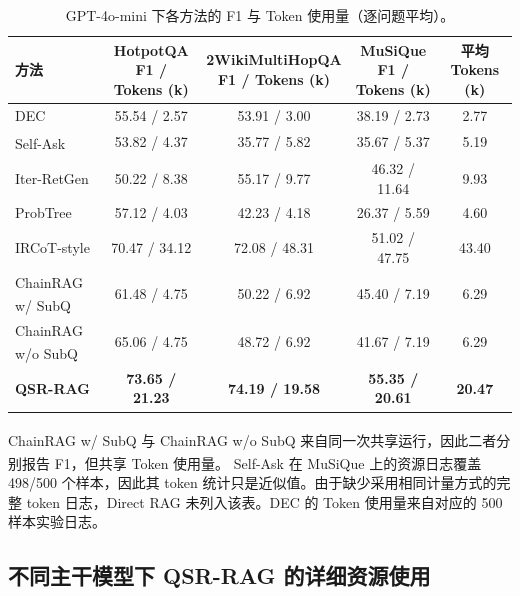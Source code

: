 \documentclass[11pt]{article}
\begin{document}
	\begin{table}[t]
		\centering
		\caption{GPT-4o-mini 下各方法的 F1 与 Token 使用量（逐问题平均）。}
		\label{tab:token-usage}
		\small
		\setlength{\tabcolsep}{5pt}
		\begin{tabular}{lcccc}
			\toprule
			方法 & \makecell{HotpotQA\\F1 / Tokens (k)} & \makecell{2WikiMultiHopQA\\F1 / Tokens (k)} & \makecell{MuSiQue\\F1 / Tokens (k)} & 平均 Tokens (k)\\
			\midrule
			DEC                                           & 55.54 / 2.57  & 53.91 / 3.00  & 38.19 / 2.73  & 2.77\\
			Self-Ask\textsuperscript{\ddag}              & 53.82 / 4.37  & 35.77 / 5.82  & 35.67 / 5.37  & 5.19\\
			Iter-RetGen                                    & 50.22 / 8.38  & 55.17 / 9.77  & 46.32 / 11.64 & 9.93\\
			ProbTree                                       & 57.12 / 4.03  & 42.23 / 4.18  & 26.37 / 5.59  & 4.60\\
			IRCoT-style                                    & 70.47 / 34.12 & 72.08 / 48.31 & 51.02 / 47.75 & 43.40\\
			ChainRAG w/ SubQ\textsuperscript{\dag}        & 61.48 / 4.75  & 50.22 / 6.92  & 45.40 / 7.19  & 6.29\\
			ChainRAG w/o SubQ\textsuperscript{\dag}       & 65.06 / 4.75  & 48.72 / 6.92  & 41.67 / 7.19  & 6.29\\
			\textbf{QSR-RAG}                               & \textbf{73.65 / 21.23} & \textbf{74.19 / 19.58} & \textbf{55.35 / 20.61} & \textbf{20.47}\\
			\bottomrule
		\end{tabular}
	\end{table}

	\noindent\textsuperscript{\dag} ChainRAG w/ SubQ 与 ChainRAG w/o SubQ 来自同一次共享运行，因此二者分别报告 F1，但共享 Token 使用量。\textsuperscript{\ddag} Self-Ask 在 MuSiQue 上的资源日志覆盖 498/500 个样本，因此其 token 统计只是近似值。由于缺少采用相同计量方式的完整 token 日志，Direct RAG 未列入该表。DEC 的 Token 使用量来自对应的 500 样本实验日志。


	\subsection{不同主干模型下 QSR-RAG 的详细资源使用}
\end{document}
